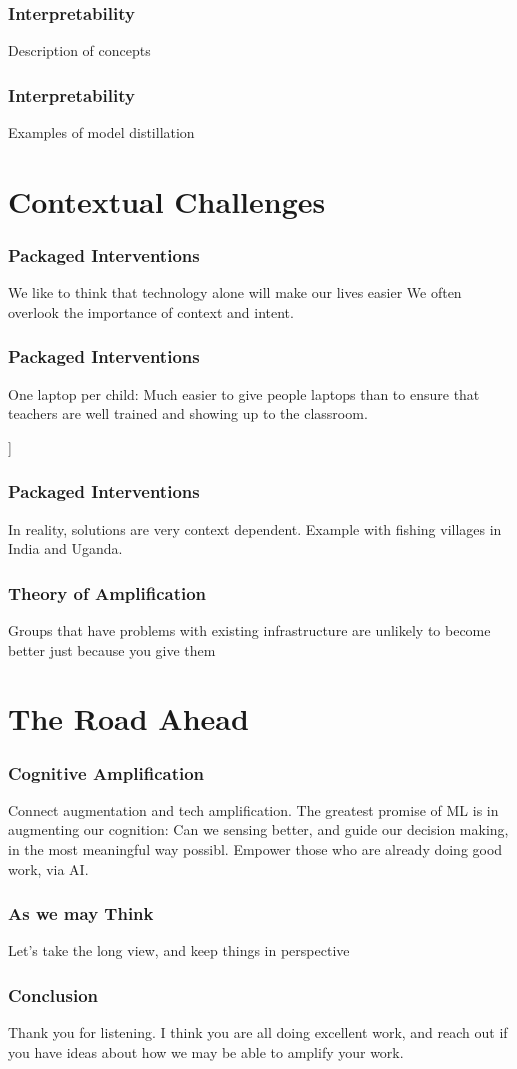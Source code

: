 \documentclass[10pt,mathserif]{beamer}
\begin{document}
\begin{frame}
  \frametitle{Interpretability}
  Description of concepts
\end{frame}

\begin{frame}
  \frametitle{Interpretability}
  Examples of model distillation
\end{frame}

\section{Contextual Challenges}
\label{sec:label}

\begin{frame}
  \frametitle{Packaged Interventions}
  We like to think that technology alone will make our lives easier
  We often overlook the importance of context and intent.
\end{frame}

\begin{frame}
  \frametitle{Packaged Interventions}
  One laptop per child: Much easier to give people laptops than to ensure that
  teachers are well trained and showing up to the classroom.
\end{frame}

\begin{frame}]
  \frametitle{Packaged Interventions}
  In reality, solutions are very context dependent.
  Example with fishing villages in India and Uganda.
\end{frame}

\begin{frame}
  \frametitle{Theory of Amplification}
  Groups that have problems with existing infrastructure are unlikely to become
  better just because you give them
\end{frame}

\section{The Road Ahead}
\label{sec:label}

\begin{frame}
  \frametitle{Cognitive Amplification}
  Connect augmentation and tech amplification.
  The greatest promise of ML is in augmenting our cognition: Can we sensing
  better, and guide our decision making, in the most meaningful way possibl.
  Empower those who are already doing good work, via AI.
\end{frame}

\begin{frame}
  \frametitle{As we may Think}
  Let's take the long view, and keep things in perspective
\end{frame}

\begin{frame}
  \frametitle{Conclusion}
  Thank you for listening. I think you are all doing excellent work, and reach
  out if you have ideas about how we may be able to amplify your work.
\end{frame}



\end{document}
